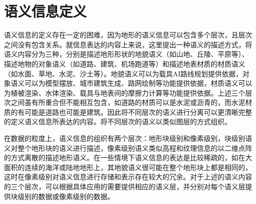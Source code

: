 \section{语义信息定义}
语义信息的定义存在一定的困难，因为地形的语义信息可以包含多个层次，且层次之间没有包含关系。就信息表达的内容上来说，这里提出一种语义的描述方式，将语义内容分为三种，分别是描述地形形状的地貌语义（如山地、丘陵、平原等）、描述地物的对象语义（如道路、建筑、机场跑道等）和描述地表材质的材质语义（如水面、草地、水泥、沙土等）。地貌语义可以为载具AI路线规划提供依据，对象语义可以为模型摆放、城市建筑生成、路网绘制等功能提供依据，材质语义可以为植被渲染、水体渲染、载具与地表间的摩擦力计算等功能提供依据。上述三个层次之间虽有所重合但不能相互包含，如道路的材质可以是水泥或沥青的，而水泥材质的有可能是道路也可能是建筑。因此将不同层次的语义进行分离可以更清晰完整的定义语义信息所表达的内容。将不同层次的语义以类似图层的方式组织。\par
在数据的粒度上，语义信息的组织有两个层次：地形块级别和像素级别，块级别语义对整个地形块的语义进行描述，像素级别语义类似高程和纹理信息的以二维点阵的方式离散的描述地形语义。在一些情境下语义信息的表达是比较稀疏的，如在大面积的连续的海洋或陆地地形上，其地貌语义很可能在整个地形块上都是相同的，这时在像素级别对语义信息进行存储和表示存在较大的冗余。对于上述的语义内容的三个层次，可以根据具体应用的需要提供相应的语义层，并分别对每个语义层提供块级别的数据或像素级别的数据。\par
